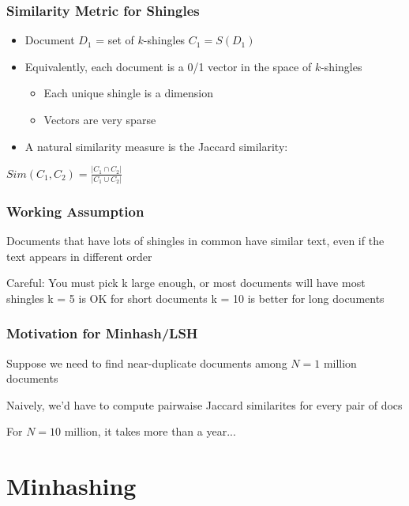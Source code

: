\documentclass[svgnames]{beamer}
\begin{document}
  
\begin{frame} \frametitle{Similarity Metric for Shingles}

\begin{itemize}
\item Document $D_1$ = set of $k$-shingles $C_1=S(D_1)$
\item Equivalently, each document is a 0/1 vector in the space of $k$-shingles
   \begin{itemize}
   \item Each unique shingle is a dimension
   \item Vectors are very sparse
   \end{itemize}
\item A natural similarity measure is the Jaccard similarity:
\end{itemize}

\begin{block}{}
\begin{center}
$Sim(C_1, C_2) = \frac{|C_1 \cap C_2|}{|C_1 \cup C_2|}$
\end{center}
\end{block}
\end{frame}

  
\begin{frame} \frametitle{Working Assumption}

Documents that have lots of shingles in common have similar text, even if the text appears in different order

Careful: You must pick k large enough, or most documents will have most shingles
   k = 5 is OK for short documents
   k = 10 is better for long documents

\end{frame}

  
\begin{frame} \frametitle{Motivation for Minhash/LSH}
Suppose we need to find near-duplicate documents among $N=1$ million documents

Naively, we'd have to compute pairwaise Jaccard similarites for every pair of docs

For $N = 10$ million, it takes more than a year...
\end{frame}

\section{Minhashing}
\end{document}

